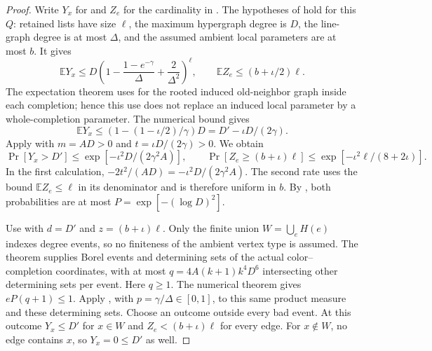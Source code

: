 \begin{proof}
Write $Y_x$ for  and $Z_e$ for the
cardinality in . The hypotheses of
 hold for this $Q$: retained lists have
size $\ell$, the maximum hypergraph degree is $D$, the line-graph degree
is at most $\Delta$, and the assumed ambient local parameters are at most
$b$. It gives
\[
\mathbb EY_x\le D\left(1-\frac{1-e^{-\gamma}}\Delta+
\frac2{\Delta^2}\right)^\ell,\qquad
\mathbb EZ_e\le(b+\iota/2)\ell.
\]
The expectation theorem uses 
for the rooted induced old-neighbor graph inside each completion; hence
this use does not replace an induced local parameter by a whole-completion
parameter. The numerical bound gives
\[
\mathbb EY_x\le (1-(1-\iota/2)/\gamma)D
=D'-\iota D/(2\gamma).
\]
Apply  with $m=AD>0$ and
$t=\iota D/(2\gamma)>0$. We obtain
\[
\Pr[Y_x>D']\le\exp[-\iota^2D/(2\gamma^2A)],\qquad
\Pr[Z_e\ge(b+\iota)\ell]\le\exp[-\iota^2\ell/(8+2\iota)].
\]
In the first calculation, $-2t^2/(AD)=-\iota^2D/(2\gamma^2A)$.
The second rate uses the bound $\mathbb EZ_e\le\ell$ in its denominator
and is therefore uniform in $b$. By ,
both probabilities are at most $P=\exp[-(\log D)^2]$.

Use  with $d=D'$ and $z=(b+\iota)\ell$.
Only the finite union $W=\bigcup_e H(e)$ indexes degree events, so no
finiteness of the ambient vertex type is assumed.
The theorem  supplies Borel
events and determining sets of the actual color--completion coordinates,
with at most $q=4A(k+1)k^4D^6$ intersecting other determining sets per event.
Here $q\ge1$. The numerical theorem gives $eP(q+1)\le1$.
Apply , with $p=\gamma/\Delta\in[0,1]$,
to this same product measure and these determining sets. Choose an outcome
outside every bad event. At this outcome $Y_x\le D'$ for $x\in W$ and
$Z_e<(b+\iota)\ell$ for every edge. For $x\notin W$, no edge contains
$x$, so $Y_x=0\le D'$ as well.


\end{proof}

